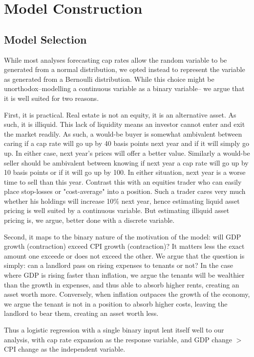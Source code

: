\section{Model Construction}

\subsection{Model Selection}
While most analyses forecasting cap rates allow the random variable to be generated from a normal distribution, we opted instead to represent the variable as generated from a Bernoulli distribution. While this choice might be unorthodox--modelling a continuous variable as a binary variable-- we argue that it is well suited for two reasons. 

First, it is practical. Real estate is not an equity, it is an alternative asset. As such, it is illiquid. This lack of liquidity means an investor cannot enter and exit the market readily. As such, a would-be buyer is somewhat ambivalent between caring if a cap rate will go up by 40 basis points next year and if it  will simply go up. In either case, next year's prices will offer a better value. Similarly a would-be seller should be ambivalent between knowing if next year a cap rate will go up by 10 basis points or if it will go up by 100. In either situation, next year is a worse time to sell than this year.  Contrast this with an equities trader who can easily place stop-losses or "cost-average" into a position. Such a trader cares very much whether his holdings will increase 10\% next year, hence estimating liquid asset pricing is well suited by a continuous variable. But estimating illiquid asset pricing is, we argue, better done with a discrete variable. 

Second, it maps to the binary nature of the motivation of the model: will GDP growth (contraction) exceed CPI growth (contraction)? It matters less the exact amount one exceede or does not exceed the other. We argue that the question is simply: can a landlord pass on rising expenses to tenants or not? In the case where GDP is rising faster than inflation, we argue the tenants will be wealthier than the growth in expenses, and thus able to absorb higher rents, creating an asset worth more. Conversely, when inflation outpaces the growth of the economy, we argue the tenant is not in a position to absorb higher costs, leaving the landlord to bear them, creating an asset worth less. 

Thus a logistic regression with a single binary input lent itself well to our analysis, with cap rate expansion as the response variable, and GDP change $ > $  CPI change as the independent variable. 

